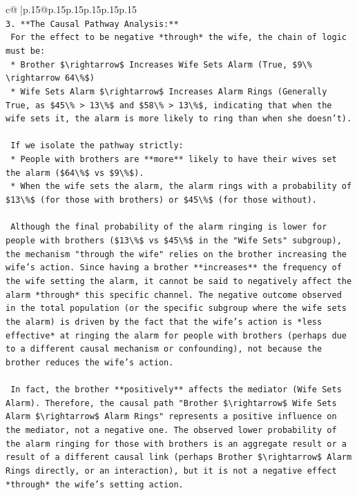 \documentclass{article}
\begin{document}
{\begin{supertabular}{c@{$\;$}|p{.15\linewidth}@{}p{.15\linewidth}p{.15\linewidth}p{.15\linewidth}p{.15\linewidth}p{.15\linewidth}}
{{{\\ 
\texttt{3.  **The Causal Pathway Analysis:**} \\
\texttt{    For the effect to be negative *through* the wife, the chain of logic must be:} \\
\texttt{    *   Brother \$\textbackslash{}rightarrow\$ Increases Wife Sets Alarm (True, \$9\textbackslash{}\% \textbackslash{}rightarrow 64\textbackslash{}\%\$)} \\
\texttt{    *   Wife Sets Alarm \$\textbackslash{}rightarrow\$ Increases Alarm Rings (Generally True, as \$45\textbackslash{}\% > 13\textbackslash{}\%\$ and \$58\textbackslash{}\% > 13\textbackslash{}\%\$, indicating that when the wife sets it, the alarm is more likely to ring than when she doesn't).} \\
\\ 
\texttt{    If we isolate the pathway strictly:} \\
\texttt{    *   People with brothers are **more** likely to have their wives set the alarm (\$64\textbackslash{}\%\$ vs \$9\textbackslash{}\%\$).} \\
\texttt{    *   When the wife sets the alarm, the alarm rings with a probability of \$13\textbackslash{}\%\$ (for those with brothers) or \$45\textbackslash{}\%\$ (for those without).} \\
\\ 
\texttt{    Although the final probability of the alarm ringing is lower for people with brothers (\$13\textbackslash{}\%\$ vs \$45\textbackslash{}\%\$ in the "Wife Sets" subgroup), the mechanism "through the wife" relies on the brother increasing the wife's action. Since having a brother **increases** the frequency of the wife setting the alarm, it cannot be said to negatively affect the alarm *through* this specific channel. The negative outcome observed in the total population (or the specific subgroup where the wife sets the alarm) is driven by the fact that the wife's action is *less effective* at ringing the alarm for people with brothers (perhaps due to a different causal mechanism or confounding), not because the brother reduces the wife's action.} \\
\\ 
\texttt{    In fact, the brother **positively** affects the mediator (Wife Sets Alarm). Therefore, the causal path "Brother \$\textbackslash{}rightarrow\$ Wife Sets Alarm \$\textbackslash{}rightarrow\$ Alarm Rings" represents a positive influence on the mediator, not a negative one. The observed lower probability of the alarm ringing for those with brothers is an aggregate result or a result of a different causal link (perhaps Brother \$\textbackslash{}rightarrow\$ Alarm Rings directly, or an interaction), but it is not a negative effect *through* the wife's setting action.} \\
}}}
\end{supertabular}}
\end{document}
